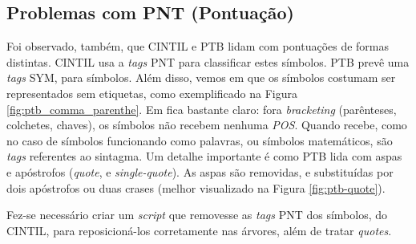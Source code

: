 \subsection{Problemas com PNT (Pontuação)}
\label{subsec:cintil-pnt}
Foi observado, também, que CINTIL e PTB lidam com pontuações de formas distintas. CINTIL usa a \textit{tags} PNT para classificar estes símbolos. PTB prevê uma \textit{tags} SYM, para símbolos. Além disso, vemos em  que os símbolos costumam ser representados sem etiquetas, como exemplificado na Figura \ref{fig:ptb_comma_parenthe}. Em  fica bastante claro: fora \textit{bracketing} (parênteses, colchetes, chaves), os símbolos não recebem nenhuma \textit{POS}. Quando recebe, como no caso de símbolos funcionando como palavras, ou símbolos matemáticos, são \textit{tags} referentes ao sintagma. Um detalhe importante é como PTB lida com aspas e apóstrofos (\textit{quote}, e \textit{single-quote}). As aspas são removidas, e substituídas por dois apóstrofos ou duas crases (melhor visualizado na Figura \ref{fig:ptb-quote}).

\begin{center}
    
\end{center}

\begin{center}
    
\end{center}

Fez-se necessário criar um \textit{script} que removesse as \textit{tags} PNT dos símbolos, do CINTIL, para reposicioná-los corretamente nas árvores, além de tratar \textit{quotes}.

